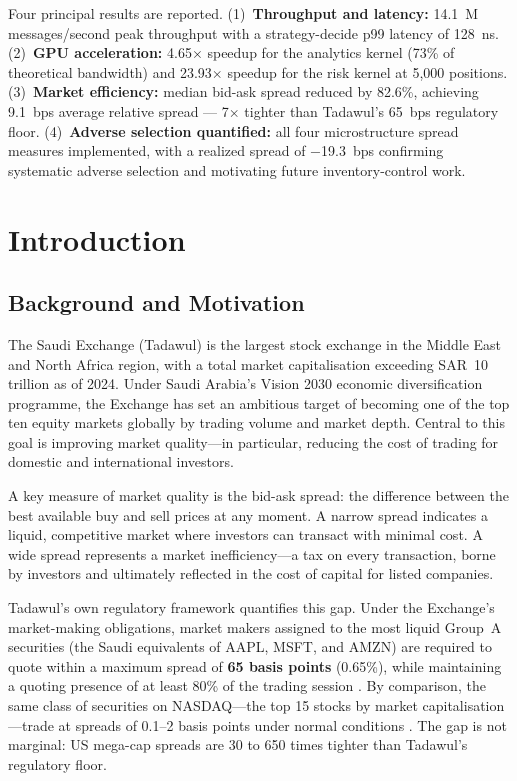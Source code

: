 \documentclass[12pt]{article}
\begin{document}
Four principal results are reported. (1)~\textbf{Throughput and latency:}
14.1~M messages/second peak throughput with a strategy-decide p99 latency
of 128~ns. (2)~\textbf{GPU acceleration:} 4.65$\times$ speedup for the
analytics kernel (73\% of theoretical bandwidth) and 23.93$\times$ speedup
for the risk kernel at 5,000 positions. (3)~\textbf{Market efficiency:}
median bid-ask spread reduced by 82.6\%, achieving 9.1~bps average relative
spread --- 7$\times$ tighter than Tadawul's 65~bps regulatory floor.
(4)~\textbf{Adverse selection quantified:} all four microstructure spread
measures implemented, with a realized spread of $-$19.3~bps confirming
systematic adverse selection and motivating future inventory-control work.

\newpage

\section{Introduction}

\subsection{Background and Motivation}

The Saudi Exchange (Tadawul) is the largest stock exchange in the Middle East
and North Africa region, with a total market capitalisation exceeding SAR~10
trillion as of 2024. Under Saudi Arabia's Vision 2030 economic diversification
programme, the Exchange has set an ambitious target of becoming one of the top
ten equity markets globally by trading volume and market depth. Central to this
goal is improving market quality---in particular, reducing the cost of trading
for domestic and international investors.

A key measure of market quality is the bid-ask spread: the difference between
the best available buy and sell prices at any moment. A narrow spread indicates
a liquid, competitive market where investors can transact with minimal cost.
A wide spread represents a market inefficiency---a tax on every transaction,
borne by investors and ultimately reflected in the cost of capital for listed
companies.

Tadawul's own regulatory framework quantifies this gap. Under the Exchange's
market-making obligations, market makers assigned to the most liquid Group~A
securities (the Saudi equivalents of AAPL, MSFT, and AMZN) are required to
quote within a maximum spread of \textbf{65 basis points} (0.65\%), while
maintaining a quoting presence of at least 80\% of the trading session
\cite{tadawul2023}. By comparison, the same class of securities on NASDAQ---the
top 15 stocks by market capitalisation---trade at spreads of 0.1--2 basis points
under normal conditions \cite{harris2003}. The gap is not marginal: US mega-cap
spreads are 30 to 650 times tighter than Tadawul's regulatory floor.
\end{document}

